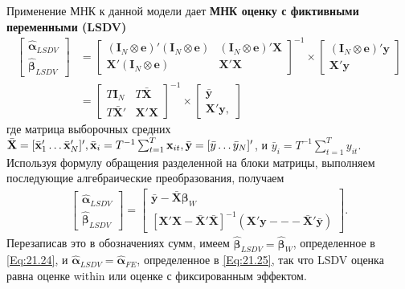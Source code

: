Применение МНК к данной модели дает \textbf{МНК оценку с фиктивными переменными (LSDV)}
 \begin{align}
\begin{bmatrix}
 \hat{\bm\alpha}_{LSDV} \\ \hat{\bm\beta}_{LSDV}
\end{bmatrix}
&=
\begin{bmatrix}
(\mathbf I_N \otimes \mathbf e)'(\mathbf I_N \otimes \mathbf e) & (\mathbf I_N \otimes \mathbf e)'\mathbf X\\
\mathbf X'(\mathbf I_N \otimes \mathbf e) & \mathbf X' \mathbf X
\end{bmatrix}
^{-1} \times
\begin{bmatrix}
(\mathbf I_N \otimes \mathbf e)'\mathbf y\\
\mathbf X'\mathbf y
\end{bmatrix} 
\nonumber \\
&=
\begin{bmatrix}
T \mathbf I_N & T\bar{\mathbf X} \\
T \bar{\mathbf X}' & \mathbf X' \mathbf X
\end{bmatrix}
^{-1} \times
\begin{bmatrix}
 \bar{\mathbf y} \\ \mathbf X' \mathbf y,
\end{bmatrix}
\nonumber
\end{align}
где матрица выборочных средних $\bar{\mathbf X}=[\bar{\mathbf{x}}'_1 \dots \bar{\mathbf{x}}'_N]', \bar{\mathbf{x}}_i=T^{-1} \sum^T_{t=1} \mathbf{x}_{it}, \bar{\mathbf y}=[\bar{y} \dots \bar{y}_N]'$, и $\bar{y}_i=T^{-1} \sum^T_{t=1} y_{it}$. Используя формулу обращения разделенной на блоки матрицы, выполняем последующие алгебраические преобразования, получаем
 \begin{align}
\begin{bmatrix}
 \hat{\bm\alpha}_{LSDV} \\ \hat{\bm\beta}_{LSDV}
\end{bmatrix}
=
\begin{bmatrix}
\bar{\mathbf y}-\bar{\mathbf X} \bm\beta_W\\
[\mathbf X'\mathbf X-\bar{\mathbf X}'\bar{\mathbf X}]^{-1}(\mathbf X' \mathbf y --- \bar{\mathbf X}'\bar{\mathbf y}) 
\end{bmatrix}.
\label{Eq:21.40}
\end{align}
Перезаписав это в обозначениях сумм, имеем $\hat{\bm\beta}_{LSDV}=\hat{\bm\beta}_{W}$, определенное в \ref{Eq:21.24}, и $\hat{\bm\alpha}_{LSDV}=\hat{\bm\alpha}_{FE}$, определенное в \ref{Eq:21.25}, так что LSDV оценка равна оценке within или оценке с фиксированным эффектом. 

